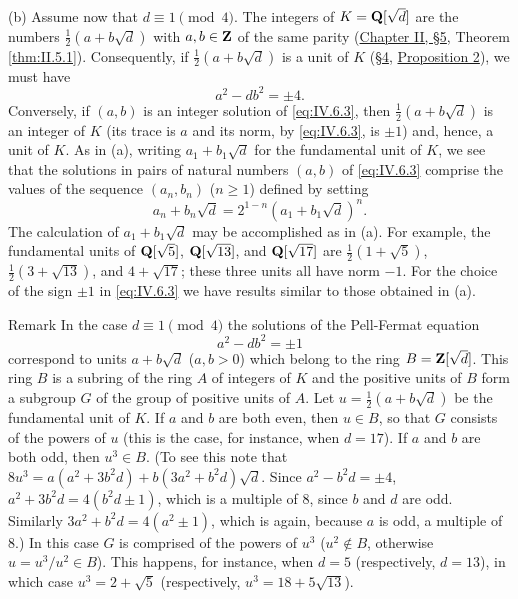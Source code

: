 (b) Assume now that $d\equiv1\pmod{4}$. The integers of $K=\mathbf{Q}[\sqrt{d}]$
are the numbers $\frac{1}{2}(a+b\sqrt{d})$ with $a,b\in\mathbf{Z}$ of the same
parity (\hyperref[sec:2.5]{Chapter II, §5}, Theorem \ref{thm:II.5.1}). Consequently, if
$\frac{1}{2}(a+b\sqrt{d})$ is a unit of $K$ (\hyperref[sec:4.4]{§4}, \hyperref[prop:IV.4.1]{Proposition 2}), we must
have
\begin{equation}
a^{2}-db^{2}=\pm4.
\label{eq:IV.6.3}
\end{equation}
Conversely, if $(a,b)$ is an integer solution of \eqref{eq:IV.6.3}, then
$\frac{1}{2}(a+b\sqrt{d})$ is an integer of $K$ (its trace is $a$ and its
norm, by \eqref{eq:IV.6.3}, is $\pm1$) and, hence, a unit of $K$. As in
(a), writing $a_{1}+b_{1}\sqrt{d}$ for the fundamental unit of $K$, we see
that the solutions in pairs of natural numbers $(a,b)$ of \eqref{eq:IV.6.3}
comprise the values of the sequence $(a_{n},b_{n})$ ($n\geq1$) defined by
setting
\begin{equation}
a_{n}+b_{n}\sqrt{d}=2^{1-n}(a_{1}+b_{1}\sqrt{d})^{n}.
\label{eq:IV.6.4}
\end{equation}
The calculation of $a_{1}+b_{1}\sqrt{d}$ may be accomplished as in (a). For
example, the fundamental units of $\mathbf{Q}[\sqrt{5}]$, $\mathbf{Q}[\sqrt{13}]$, and
$\mathbf{Q}[\sqrt{17}]$ are $\frac{1}{2}(1+\sqrt{5})$, $\frac{1}{2}(3+\sqrt{13})$,
and $4+\sqrt{17}$; these three units all have norm $-1$. For the choice of
the sign $\pm1$ in \eqref{eq:IV.6.3} we have results similar to those
obtained in (a).

\begin{statement}{Remark}
\upshape
In the case $d\equiv1\pmod{4}$ the solutions of the Pell-Fermat equation
\begin{equation}
a^{2}-db^{2}=\pm1
\label{eq:IV.6.5}
\end{equation}
correspond to units $a+b\sqrt{d}$ ($a,b>0$) which belong to the ring
$B=\mathbf{Z}[\sqrt{d}]$. This ring $B$ is a subring of the ring $A$ of integers of
$K$ and the positive units of $B$ form a subgroup $G$ of the group of
positive units of $A$. Let $u=\frac{1}{2}(a+b\sqrt{d})$ be the fundamental
unit of $K$. If $a$ and $b$ are both even, then $u\in B$, so that $G$
consists of the powers of $u$ (this is the case, for instance, when $d=17$).
If $a$ and $b$ are both odd, then $u^{3}\in B$. (To see this note that
$8u^{3}=a(a^{2}+3b^{2}d)+b(3a^{2}+b^{2}d)\sqrt{d}$. Since
$a^{2}-b^{2}d=\pm4$, $a^{2}+3b^{2}d=4(b^{2}d\pm1)$, which is a multiple of
$8$, since $b$ and $d$ are odd. Similarly $3a^{2}+b^{2}d=4(a^{2}\pm1)$,
which is again, because $a$ is odd, a multiple of $8$.) In this case $G$ is
comprised of the powers of $u^{3}$ ($u^{2}\notin B$, otherwise
$u=u^{3}/u^{2}\in B$). This happens, for instance, when $d=5$
(respectively, $d=13$), in which case $u^{3}=2+\sqrt{5}$ (respectively,
$u^{3}=18+5\sqrt{13}$).
\end{statement}

